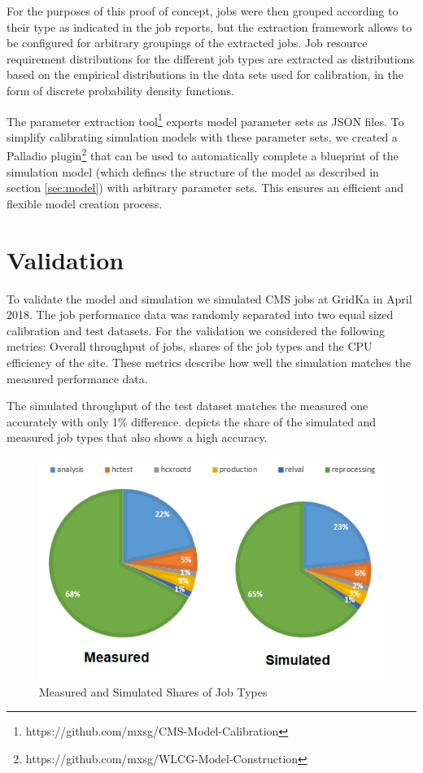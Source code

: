\documentclass[a4paper]{jpconf}
\begin{document}
For the purposes of this proof of concept, jobs were then grouped according to their type as indicated in the job reports, but the extraction framework allows to be configured for arbitrary groupings of the extracted jobs.
Job resource requirement distributions for the different job types are extracted as distributions based on the empirical distributions in the data sets used for calibration, in the form of discrete probability density functions.

The parameter extraction tool\footnote{https://github.com/mxsg/CMS-Model-Calibration} exports model parameter sets as JSON files.
To simplify calibrating simulation models with these parameter sets, we created a Palladio plugin\footnote{https://github.com/mxsg/WLCG-Model-Construction} that can be used to automatically complete a blueprint of the simulation model (which defines the structure of the model as described in section \ref{sec:model}) with arbitrary parameter sets.
This ensures an efficient and flexible model creation process.

\section{Validation}
\label{validation}
To validate the model and simulation we simulated CMS jobs at GridKa in April 2018.
The job performance data was randomly separated into two equal sized calibration and test datasets. For the validation we considered the following metrics: Overall throughput of jobs, shares of the job types and the CPU efficiency of the site. These metrics describe how well the simulation matches the measured performance data.

The simulated throughput of the test dataset matches the measured one accurately with only 1\% difference.
 depicts the share of the simulated and measured job types that also shows  a high accuracy.

\begin{figure}[h]
	\centering
	\includegraphics[scale = 0.6]{images/shares}
	\caption[]{Measured and Simulated Shares of Job Types}
	\label{shares}
\end{figure}
\end{document}
